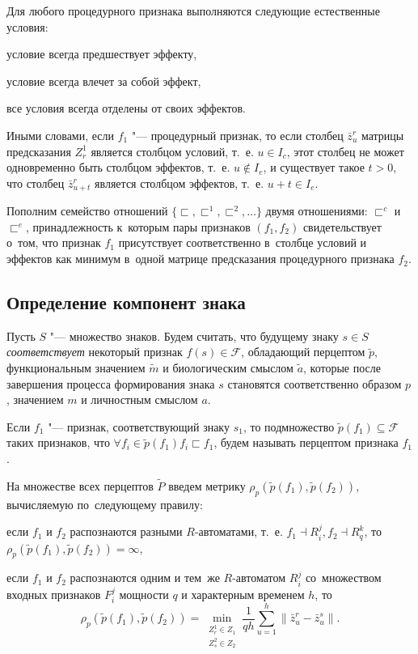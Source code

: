 \documentclass[a4paper, 12pt]{article}
\numberwithin{equation}{section}
\begin{document}
	Для любого процедурного признака выполняются следующие естественные условия:
	
	\indent условие всегда предшествует эффекту,
	
	\indent условие всегда влечет за собой эффект,
	
	\indent все условия всегда отделены от своих эффектов.
		
	Иными словами, если $f_1$ "--- процедурный признак, то если столбец $\bar z_u^r$ матрицы предсказания $Z_r^1$ является столбцом условий, т.~е. $u\in{I_c}$, этот столбец не может одновременно быть столбцом эффектов, т.~е. $u\not\in I_e$, и существует такое $t>0$, что столбец $\bar z_{u+t}^r$ является столбцом эффектов, т.~е. $u+t\in I_e$.
		
	Пополним семейство отношений $\{\sqsubset,\sqsubset^1,\sqsubset^2,\dots\}$ двумя отношениями: $\sqsubset^c$ и $\sqsubset^e$, принадлежность к~которым пары признаков $(f_1,f_2)$ свидетельствует о~том, что признак $f_1$ присутствует соответственно в~столбце условий и эффектов как минимум в~одной матрице предсказания процедурного признака $f_2$.
		
	\subsection{Определение компонент знака}\label{subst:sign_comp}
	Пусть $S$ "--- множество знаков. Будем считать, что будущему знаку $s\in S$ \textit{соответствует} некоторый признак $f(s)\in\mathcal F$, обладающий перцептом $\tilde p$, функциональным значением $\tilde m$ и биологическим смыслом $\tilde a$, которые после завершения процесса формирования знака $s$ становятся соответственно образом $p$, значением $m$ и личностным смыслом $a$.
	
		Если $f_1$ "--- признак, соответствующий знаку $s_1$, то подмножество $\tilde p(f_1)\subseteq\mathcal F$ таких признаков, что $\forall f_i\in\tilde p(f_1) f_i\sqsubset f_1$, будем называть перцептом признака $f_1$.
	
	На множестве всех перцептов $\tilde P$ введем метрику $\rho_p(\tilde p(f_1),\tilde p(f_2))$, вычисляемую по~следующему правилу:
	
	\indent если $f_1$ и $f_2$ распознаются разными $R$-автоматами, т.~е. $f_1\dashv R_i^j, f_2\dashv R_q^k$, то $\rho_p(\tilde p(f_1),\tilde p(f_2))=\infty$,
	
	\indent если $f_1$ и $f_2$ распознаются одним и тем~же $R$-автоматом $R_i^j$ со~множеством входных признаков $F_i^j$ мощности $q$ и характерным временем $h$, то
		\begin{equation*}
			\rho_p(\tilde p(f_1),\tilde p(f_2))=\min\limits_{\substack{Z_r^1\in Z_1\\Z_s^2\in Z_2}}\frac{1}{qh}\sum\limits_{u=1}^h\|\bar z_u^r-\bar z_u^s\|.
		\end{equation*} 
	
\end{document}
